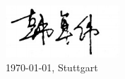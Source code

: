 \documentclass{resume} %
\begin{document}
\begin{CJK*}{UTF8}{gbsn}
% 
% 
\vspace{1cm}
\includegraphics[scale=0.7]{signature.png}\\
\today, Stuttgart
\clearpage\end{CJK*}
%
\end{document}

